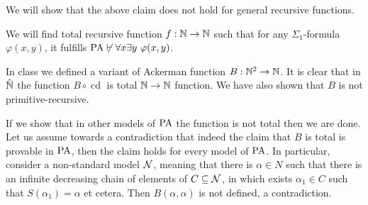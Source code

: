 \subquestion{}
We will show that the above claim does not hold for general recursive functions.
\begin{solution}
	We will find total recursive function $f : \mathbb{N} \to \mathbb{N}$ such that for any $\Sigma_1$-formula $\varphi(x, y)$, it fulfills $\operatorname{PA} \not\vdash \forall x \exists y\ \varphi(x, y)$.

	In class we defined a variant of Ackerman function $B : \mathbb{N}^2 \to \mathbb{N}$.
	It is clear that in $\hat{\mathbb{N}}$ the function $B \circ \operatorname{cd}$ is total $\mathbb{N} \to \mathbb{N}$ function.
	We have also shown that $B$ is not primitive-recursive.

	If we show that in other models of $\operatorname{PA}$ the function is not total then we are done.
	Let us assume towards a contradiction that indeed the claim that $B$ is total is provable in $\operatorname{PA}$, then the claim holds for every model of $\operatorname{PA}$.
	In particular, consider a non-standard model $\mathcal{N}$, meaning that there is $\alpha \in N$ such that there is an infinite decreasing chain of elements of $C \subseteq \mathcal{N}$,
	in which exists $\alpha_1 \in C$ such that $S(\alpha_1) = \alpha$ et cetera.
	Then $B(\alpha, \alpha)$ is not defined, a contradiction.
\end{solution}

